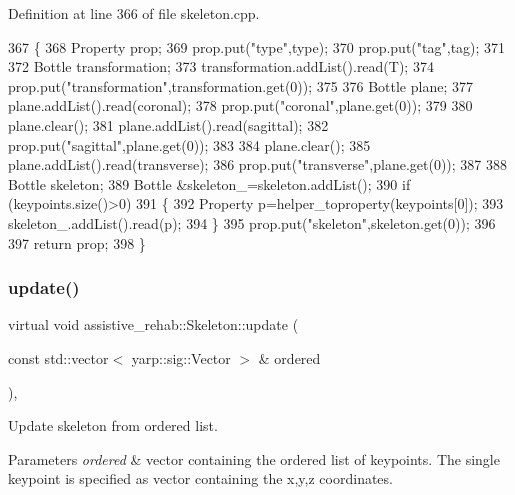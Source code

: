 Definition at line 366 of file skeleton.\+cpp.


\begin{DoxyCode}
367 \{
368     Property prop;
369     prop.put(\textcolor{stringliteral}{"type"},type);
370     prop.put(\textcolor{stringliteral}{"tag"},tag);
371 
372     Bottle transformation;
373     transformation.addList().read(T);
374     prop.put(\textcolor{stringliteral}{"transformation"},transformation.get(0));
375 
376     Bottle plane;
377     plane.addList().read(coronal);
378     prop.put(\textcolor{stringliteral}{"coronal"},plane.get(0));
379 
380     plane.clear();
381     plane.addList().read(sagittal);
382     prop.put(\textcolor{stringliteral}{"sagittal"},plane.get(0));
383 
384     plane.clear();
385     plane.addList().read(transverse);
386     prop.put(\textcolor{stringliteral}{"transverse"},plane.get(0));
387 
388     Bottle skeleton;
389     Bottle &skeleton\_=skeleton.addList();
390     \textcolor{keywordflow}{if} (keypoints.size()>0)
391     \{
392         Property p=helper\_toproperty(keypoints[0]);
393         skeleton\_.addList().read(p);
394     \}
395     prop.put(\textcolor{stringliteral}{"skeleton"},skeleton.get(0));
396 
397     \textcolor{keywordflow}{return} prop;
398 \}
\end{DoxyCode}
\mbox{\label{classassistive__rehab_1_1Skeleton_adbb387558eac21173b7c82cb43acd603}} 
\subsubsection{\texorpdfstring{update()}{update()}\hspace{0.1cm}{\footnotesize\ttfamily [1/3]}}
{\footnotesize\ttfamily virtual void assistive\+\_\+rehab\+::\+Skeleton\+::update (\begin{DoxyParamCaption}\item[{const std\+::vector$<$ yarp\+::sig\+::\+Vector $>$ \&}]{ordered }\end{DoxyParamCaption})\hspace{0.3cm}{\ttfamily [virtual]}, {\ttfamily [inherited]}}



Update skeleton from ordered list. 


\begin{DoxyParams}{Parameters}
{\em ordered} & vector containing the ordered list of keypoints. The single keypoint is specified as vector containing the x,y,z coordinates. \\
\hline
\end{DoxyParams}
\mbox{\label{classassistive__rehab_1_1Skeleton_ab9642d6621d0a2b189c020f4d7695b14}} 
